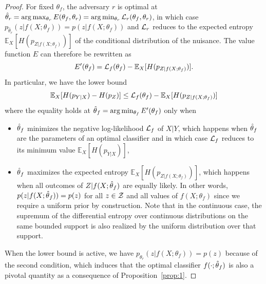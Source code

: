 \documentclass[twocolumn,superscriptaddress,aps]{revtex4-1}
\theoremstyle{plain}
\begin{document}
\begin{proof}

For fixed $\theta_f$, the adversary $r$ is optimal at $\hat\theta_r = \arg
\max_{\theta_r} E(\theta_f, \theta_r)  = \arg \min_{\theta_r} {\cal
L}_r(\theta_f, \theta_r)$, in which case $p_{\hat\theta_r}(z|f(X;\theta_f)) =
p(z|f(X;\theta_f))$ and ${\cal L}_r$ reduces to the expected entropy
$\mathbb{E}_{X} [ H(p_{Z|f(X;\theta_f)}) ]$ of the conditional distribution of the nuisance. The
value function $E$ can therefore be rewritten as $$E'(\theta_f) = {\cal
L}_f(\theta_f) - \mathbb{E}_{X} [ H(p_{Z|f(X;\theta_f)}) ].$$  In particular, we have the lower
bound $$\mathbb{E}_{X} [ H(p_{Y|X}) - H(p_Z)] \leq {\cal L}_f(\theta_f) - \mathbb{E}_{X} [H(p_{Z|f(X;\theta_f)})]$$
where the equality holds at $\smash{\hat\theta}_f = \arg \min_{\theta_f}
E'(\theta_f)$ only when
\begin{itemize}
    \item $\smash{\hat\theta}_f$ minimizes the negative log-likelihood ${\cal
    L}_f$ of $X|Y$, which happens when $\smash{\hat\theta}_f$ are the parameters
    of an optimal classifier and in which case ${\cal L}_f$ reduces to its
    minimum value $\mathbb{E}_{X} [H(p_{Y|X})]$,

    \item $\smash{\hat\theta}_f$ maximizes the expected entropy
    $\mathbb{E}_{X} [H(p_{Z|f(X;\theta_f)})]$, which happens when all outcomes of
    $Z|f(X;\smash{\hat\theta}_f)$ are equally likely. In other words,
    $p(z|f(X;\smash{\hat\theta}_f)) = p(z)$ for all $z \in {\cal Z}$ and all values of $f(X;\theta_f)$ since we
    require a uniform prior by construction. Note that in the continuous case,
    the supremum of the differential entropy over continuous distributions on
    the same bounded support is also realized by the uniform distribution over
    that support.
\end{itemize}
When the lower bound is active, we have $p_{\theta_r}(z|f(X;\theta_f)) = p(z)$
because of the second condition, which induces that the
optimal classifier $f(\cdot;\smash{\hat\theta}_f)$ is also a pivotal
quantity as a consequence of Proposition~\ref{prop:1}.

\end{proof}
\end{document}
